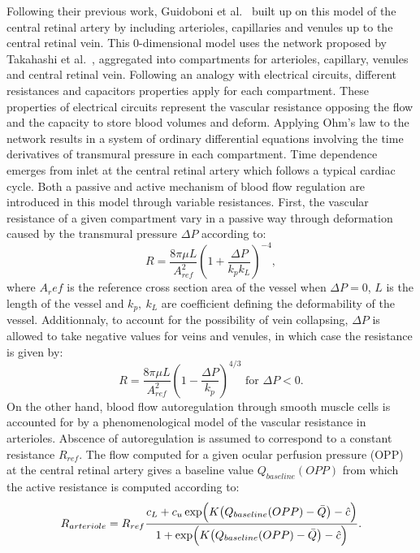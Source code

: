 \documentclass[12pt,a4paper]{article}
\begin{document}
Following their previous work, Guidoboni et al.~\cite{Guidoboni_2014b} built up on this model of the central retinal artery by including arterioles, capillaries and venules up to the central retinal vein.
This 0-dimensional model uses the network proposed by Takahashi et al.~\cite{Takahashi_2009}, aggregated into compartments for arterioles, capillary, venules and central retinal vein.
Following an analogy with electrical circuits, different resistances and capacitors properties apply for each compartment.
These properties of electrical circuits represent the vascular resistance opposing the flow and the capacity to store blood volumes and deform.
Applying Ohm's law to the network results in a system of ordinary differential equations involving the time derivatives of transmural pressure in each compartment.
Time dependence emerges from inlet at the central retinal artery which follows a typical cardiac cycle.
Both a passive and active mechanism of blood flow regulation are introduced in this model through variable resistances.
First, the vascular resistance of a given compartment vary in a passive way through deformation caused by the transmural pressure $\Delta P$ according to:
\begin{equation}
  \label{eq:PassiveVariableResistance}
  R = \frac{8\pi\mu L}{A^2_{ref}}\left(1+\frac{\Delta P}{k_pk_L}\right)^{-4},
\end{equation}
where $A_ref$ is the reference cross section area of the vessel when $\Delta P = 0$, $L$ is the length of the vessel and $k_p,~k_L$ are coefficient defining the deformability of the vessel.
Additionnaly, to account for the possibility of vein collapsing, $\Delta P$ is allowed to take negative values for veins and venules, in which case the resistance is given by:
\begin{equation}
  \label{eq:PassiveVariableResistanceCollapse}
  R = \frac{8\pi\mu L}{A^2_{ref}}\left(1-\frac{\Delta P}{k_p}\right)^{4/3} \text{ for } \Delta P<0.
\end{equation}
On the other hand, blood flow autoregulation through smooth muscle cells is accounted for by a phenomenological model of the vascular resistance in arterioles.
Abscence of autoregulation is assumed to correspond to a constant resistance $R_{ref}$.
The flow computed for a given ocular perfusion pressure (OPP) at the central retinal artery gives a baseline value $Q_{baseline}(OPP)$ from which the active resistance is computed according to:
\begin{equation}
  \label{eq:ActiveResistancePhenomenological}
  R_{arteriole} = R_{ref}\frac{c_L + c_u\exp\Bigl(K\bigl(Q_{baseline}(OPP)-\bar Q\bigr)-\hat c\Bigr)}{1 + \exp\Bigl(K\bigl(Q_{baseline}(OPP)-\bar Q\bigr)-\hat c\Bigr)}.
\end{equation}
\end{document}
